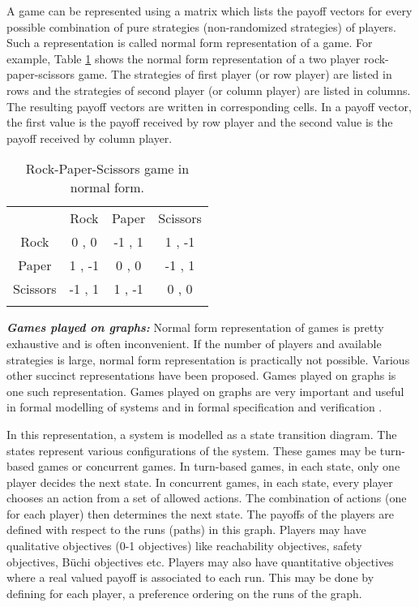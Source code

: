 A game can be represented using a matrix which lists the payoff vectors for every possible combination of pure strategies (non-randomized strategies) of players. Such a representation is called normal form representation of a game. For example, Table \ref{table:rps} shows the normal form representation of a two player rock-paper-scissors game. The strategies of first player (or row player) are listed in rows and the strategies of second player (or column player) are listed in columns. The resulting payoff vectors are written in corresponding cells. In a payoff vector, the first value is the payoff received by row player and the second value is the payoff received by column player.

\begin{table}[h]
\centering
\caption{Rock-Paper-Scissors game in normal form.}
\label{table:rps}
\begin{tabular}{c c c c}
\noalign{\smallskip}\noalign{\smallskip}\noalign{\smallskip}\noalign{\smallskip}\hline\noalign{\smallskip}
         & Rock   & Paper  & Scissors \\ \noalign{\smallskip}\hline\noalign{\smallskip}
Rock     & 0 , 0  & -1 , 1 & 1 , -1   \\
Paper    & 1 , -1 & 0 , 0  & -1 , 1   \\
Scissors & -1 , 1 & 1 , -1 & 0 , 0    \\ \noalign{\smallskip}\hline
\end{tabular}
\end{table}

\textit{\textbf{Games played on graphs:}} Normal form representation of games is pretty exhaustive and is often inconvenient. If the number of players and available strategies is large, normal form representation is practically not possible. Various other succinct representations have been proposed. Games played on graphs is one such representation. Games played on graphs are very important and useful in formal modelling of systems and in formal specification and verification \cite{9}.

In this representation, a system is modelled as a state transition diagram. The states represent various configurations of the system. These games may be turn-based games or concurrent games. In turn-based games, in each state, only one player decides the next state. In concurrent games, in each state, every player chooses an action from a set of allowed actions. The combination of actions (one for each player) then determines the next state. The payoffs of the players are defined with respect to the runs (paths) in this graph. Players may have qualitative objectives (0-1 objectives) like reachability objectives, safety objectives, B{\"u}chi objectives etc. Players may also have quantitative objectives where a real valued payoff is associated to each run. This may be done by defining for each player, a preference ordering on the runs of the graph.

